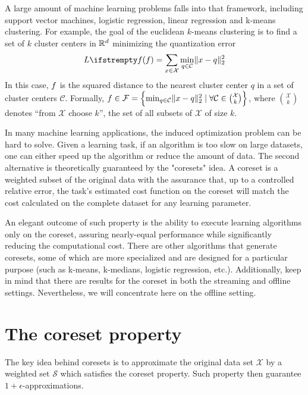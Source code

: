A large amount of machine learning problems falls into that framework, including support vector machines, logistic regression, linear regression and k-means clustering. For example, the goal of the euclidean $k$-means clustering is to find a set of $k$ cluster centers in $\mathbb{R}^d$ minimizing the quantization error
\begin{equation*}
\loss{\query} = \sum_{x \in \mathcal{X}} \min_{q \in \mathcal{C} } \lVert x - q \rVert^2_2
\end{equation*}
In this case, $f$ is the squared distance to the nearest cluster center $q$ in a set of cluster centers $\mathcal{C}$. Formally, $f  \in \mathcal{F} = \left\{\min_{q \in \mathcal{C} } \lVert x - q \rVert^2_2 \mid \forall \mathcal{C}  \in \binom{\mathcal{X}}{k}\right\}  $, where $\binom{\mathcal{X}}{k}$ denotes ``from $\mathcal{X}$ choose $k$'', the set of all subsets of $\mathcal{X}$ of size $k$.

In many machine learning applications, the induced optimization problem can be hard to solve. Given a learning task, if an algorithm is too slow on large datasets, one can either speed up the algorithm or reduce the amount of data.
The second alternative is theoretically guaranteed by the "coresets" idea.
A coreset is a weighted subset of the original data with the assurance that, up to a controlled relative error, the task's estimated cost function on the coreset will match the cost calculated on the complete dataset for any learning parameter.

An elegant outcome of such property is the ability to execute learning algorithms only on the coreset, assuring nearly-equal performance while significantly reducing the computational cost. There are other algorithms that generate coresets, some of which are more specialized and are designed for a particular purpose (such as k-means, k-medians, logistic regression, etc.). Additionally, keep in mind that there are results for the coreset in both the streaming and offline settings. Nevertheless, we will concentrate here on the offline setting.


\section{The coreset property}

The key idea behind coresets is to approximate the original data
set $\mathcal{X}$ by a weighted set $\mathcal{S}$ which satisfies the coreset property. Such property then guarantee $1+\epsilon$-approximations.

